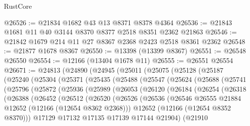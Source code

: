 \begin{lexlean}{RustCore}
\begin{coremodule}
@26526 := @21834 @1682 @43 @13 @8371 @8378 @4364
@26536 := @21843 @1681 @11 @40 @3144 @8370 @8377 @2518 @8351 @2362 @21863
@26546 := @21842 @1679 @214 @11 @27 @8367 @2368 @2423 @2518 @8361 @2362
@26548 := @21877 @1678 @8367
@26550 := @13398 (@13399 @8367)
@26551 := @26548 @26550
@26554 := @12166 (@13404 @1678 @11)
@26555 := @26551 @26554
@26671 := @24813
    (@24890
      (@24945
        (@25011
          (@25075
            (@25128
              (@25187
                (@25240
                  (@25304
                    (@25371
                      (@25435
                        (@25488
                          (@25547
                            (@25624
                              (@25688
                                (@25741
                                  (@25796
                                    (@25872
                                      (@25936
                                        (@25989
                                          (@26053
                                            (@26120
                                              (@26184
                                                (@26254
                                                  (@26318
                                                    (@26388
                                                      (@26452
                                                        (@26512
                                                          (@26520
                                                            (@26526
                                                              (@26536
                                                                (@26546
                                                                  @26555
                                                                  @21884
                                                                  @12652
                                                                  (@12166 (@12654 @8362 @2368)))
                                                                @12652
                                                                (@12166 (@12654 @8352 @8370)))
                                                              @17129
                                                              @17132
                                                              @17135
                                                              @17139
                                                              @17144
                                                              @21904)
                                                            (@21910

\end{coremodule}
\end{lexlean}
